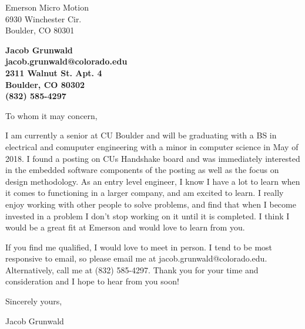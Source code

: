\documentclass[11pt]{letter} %
\begin{document}

\begin{letter}{
Emerson Micro Motion \\
6930 Winchester Cir. \\
Boulder, CO 80301}


\begin{center}
\large\bf Jacob Grunwald \\ jacob.grunwald@colorado.edu \\
2311 Walnut St. Apt. 4 \\ Boulder, CO 80302 \\ (832) 585-4297 %
\end{center}
\vfill



\opening{To whom it may concern,}

I am currently a senior at CU Boulder and will be graduating with a BS in electrical and comuputer engineering with a minor in computer science in May of 2018. I found a posting on CUs Handshake board and was immediately interested in the embedded software components of the posting as well as the focus on design methodology. As an entry level engineer, I know I have a lot to learn when it comes to functioning in a larger company, and am excited to learn. I really enjoy working with other people to solve problems, and find that when I become invested in a problem I don't stop working on it until it is completed. I think I would be a great fit at Emerson and would love to learn from you.

If you find me qualified, I would love to meet in person. I tend to be most responsive to email, so please email me at jacob.grunwald@colorado.edu. Alternatively, call me at (832) 585-4297. Thank you for your time and consideration and I hope to hear from you soon!

Sincerely yours,

Jacob Grunwald


\end{letter}
\end{document}
